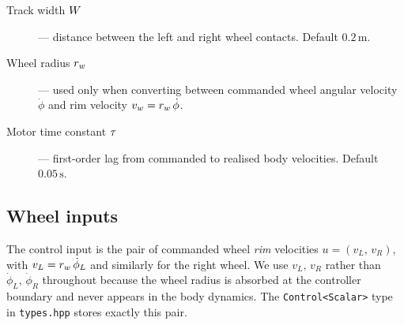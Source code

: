 \begin{description}
    \item[Track width $W$] --- distance between the left and right
        wheel contacts. Default \(0.2\,\mathrm{m}\).
    \item[Wheel radius $r_{w}$] --- used only when converting between
        commanded wheel angular velocity $\dot\phi$ and rim velocity
        $v_w = r_{w}\,\dot\phi$.
    \item[Motor time constant $\tau$] --- first-order lag from commanded
        to realised body velocities. Default \(0.05\,\mathrm{s}\).
\end{description}

\subsection{Wheel inputs}

The control input is the pair of commanded wheel \emph{rim} velocities
$u = (v_L,\, v_R)$, with $v_L = r_{w}\,\dot\phi_L$ and similarly for the
right wheel. We use $v_L,\, v_R$ rather than $\dot\phi_L,\, \dot\phi_R$
throughout because the wheel radius is absorbed at the controller boundary
and never appears in the body dynamics. The \texttt{Control<Scalar>} type
in \texttt{types.hpp} stores exactly this pair.
